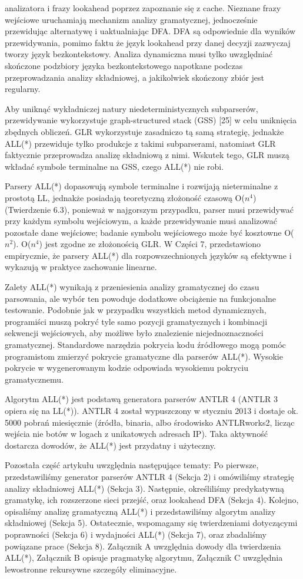 analizatora i frazy lookahead poprzez zapoznanie się z cache.
Nieznane frazy wejściowe uruchamiają mechanizm analizy gramatycznej,
jednocześnie przewidując alternatywę i uaktualniając DFA.
DFA są odpowiednie dla wyników przewidywania, pomimo faktu że język lookahead
przy danej decyzji zazwyczaj tworzy język bezkontekstowy.
Analiza dynamiczna musi tylko uwzględniać skończone podzbiory języka
bezkontekstowego napotkane podczas przeprowadzania analizy składniowej,
a jakikolwiek skończony zbiór jest regularny.
\par
Aby uniknąć wykładniczej natury niedeterministycznych subparserów,
przewidywanie wykorzystuje graph-structured stack (GSS) [25] w celu uniknięcia
zbędnych obliczeń.
GLR wykorzystuje zasadniczo tą samą strategię, jednakże ALL(*) przewiduje tylko
produkcje z takimi subparserami, natomiast GLR faktycznie przeprowadza analizę
składniową z nimi.
Wskutek tego, GLR muszą wkładać symbole terminalne na GSS, czego ALL(*) nie robi.
\par
Parsery ALL(*) dopasowują symbole terminalne i rozwijają nieterminalne z
prostotą LL, jednakże posiadają teoretyczną złożoność czasową O($n^4$)
(Twierdzenie 6.3), ponieważ w najgorszym przypadku, parser musi przewidywać
przy każdym symbolu wejściowym, a każde przewidywanie musi analizować pozostałe
dane wejściowe; badanie symbolu wejściowego może być kosztowne O($n^2$).
O($n^4$) jest zgodne ze złożonością GLR.
W Części 7, przedstawiono empirycznie, że parsery ALL(*) dla rozpowszechnionych
języków są efektywne i wykazują w praktyce zachowanie linearne.
\par
Zalety ALL(*) wynikają z przeniesienia analizy gramatycznej do czasu parsowania,
ale wybór ten powoduje dodatkowe obciążenie na funkcjonalne testowanie.
Podobnie jak w przypadku wszystkich metod dynamicznych, programiści muszą
pokryć tyle samo pozycji gramatycznych i kombinacji sekwencji wejściowych,
aby możliwe było znalezienie niejednoznaczności gramatycznej.
Standardowe narzędzia pokrycia kodu źródłowego mogą pomóc programistom zmierzyć
pokrycie gramatyczne dla parserów ALL(*).
Wysokie pokrycie w wygenerowanym kodzie odpowiada wysokiemu pokryciu gramatycznemu.
\par
Algorytm ALL(*) jest podstawą generatora parserów ANTLR 4 (ANTLR 3 opiera się na LL(*)).
ANTLR 4 został wypuszczony w styczniu 2013 i dostaje ok. 5000 pobrań miesięcznie
(źródła, binaria, albo środowisko ANTLRworks2, licząc wejścia nie botów w
logach z unikatowych adresach IP).
Taka aktywność dostarcza dowodów, że ALL(*) jest przydatny i użyteczny.
\par
Pozostała część artykułu uwzględnia następujące tematy: Po pierwsze,
przedstawiliśmy generator parserów ANTLR 4 (Sekcja 2) i omówiliśmy strategię
analizy składniowej ALL(*) (Sekcja 3).
Następnie, określiliśmy predykatywną gramatykę, ich rozszerzone sieci przejść,
oraz lookahead DFA (Sekcja 4).
Kolejno, opisaliśmy analizę gramatyczną ALL(*) i przedstawiliśmy algorytm
analizy składniowej (Sekcja 5).
Ostatecznie, wspomagamy się twierdzeniami dotyczącymi poprawności (Sekcja 6)
i wydajności ALL(*) (Sekcja 7), oraz zbadaliśmy powiązane prace (Sekcja 8).
Załącznik A uwzględnia dowody dla twierdzenia ALL(*), Załącznik B opisuje
pragmatykę algorytmu, Załącznik C uwzględnia lewostronne rekursywne
szczegóły eliminacyjne. 
